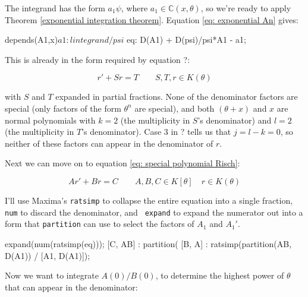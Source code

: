 The integrand has the form $a_1 \psi$, where
$a_1 \in {\mathbb C}(x, \theta)$, so we're ready to apply
Theorem \ref{exponential integration theorem}.
Equation \eqref{eq: exponential An} gives:

\begin{maximablock}
depends(A1,x)$
a1 : lintegrand/psi$
eq: D(A1) + D(psi)/psi*A1 - a1;
\end{maximablock}

\begin{comment}
(theta+x)^2*%
/* eq: ratexpand(%
/* facsum(eq*x^2,rr); */

deepmap(func, expr, level) :=
   if is(level > 0) then map(lambda([u], deepmap(func, u, level-1)), expr)
                else func(expr);

deepmap(factor, eq, 2);
\end{comment}

This is already in the form required by equation ?:

$$r' + S r = T \qquad S,T,r \in K(\theta)$$

with $S$ and $T$ expanded in partial fractions.  None of the
denominator factors are special (only factors of the form $\theta^n$
are special), and both $(\theta+x)$ and $x$ are normal polynomials
with $k=2$ (the multiplicity in $S$'s denominator) and $l=2$
(the multiplicity in $T$'s denominator).  Case 3 in ? tells us
that $j=l-k=0$, so neither of these factors can appear
in the denominator of $r$.

Next we can move on to equation \ref{eq: special polynomial Risch}:

\begin{equation*}
A r' + B r = C \qquad A,B,C \in K[\theta] \quad r \in K(\theta)
\end{equation*}

I'll use Maxima's {\tt ratsimp} to collapse the entire equation into a
single fraction, {\tt num} to discard the denominator, and {\tt
expand} to expand the numerator out into a form that {\tt partition}
can use to select the factors of $A_1$ and $A_1'$.

\begin{maximablock}
expand(num(ratsimp(eq)));
[C, AB] : partition(%
[B, A] : ratsimp(partition(AB, D(A1))
          / [A1, D(A1)]);
\end{maximablock}

Now we want to integrate $A(0)/B(0)$, to determine the highest power
of $\theta$ that can appear in the denominator:

